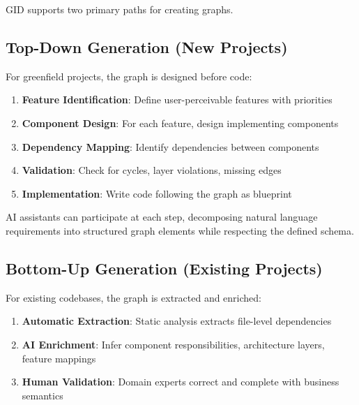 \documentclass[11pt,a4paper]{article}
\begin{document}
GID supports two primary paths for creating graphs.

\subsection{Top-Down Generation (New Projects)}

For greenfield projects, the graph is designed before code:

\begin{enumerate}[noitemsep]
    \item \textbf{Feature Identification}: Define user-perceivable features with priorities
    \item \textbf{Component Design}: For each feature, design implementing components
    \item \textbf{Dependency Mapping}: Identify dependencies between components
    \item \textbf{Validation}: Check for cycles, layer violations, missing edges
    \item \textbf{Implementation}: Write code following the graph as blueprint
\end{enumerate}

AI assistants can participate at each step, decomposing natural language requirements into structured graph elements while respecting the defined schema.

\subsection{Bottom-Up Generation (Existing Projects)}

For existing codebases, the graph is extracted and enriched:

\begin{enumerate}[noitemsep]
    \item \textbf{Automatic Extraction}: Static analysis extracts file-level dependencies
    \item \textbf{AI Enrichment}: Infer component responsibilities, architecture layers, feature mappings
    \item \textbf{Human Validation}: Domain experts correct and complete with business semantics
\end{enumerate}
\end{document}
